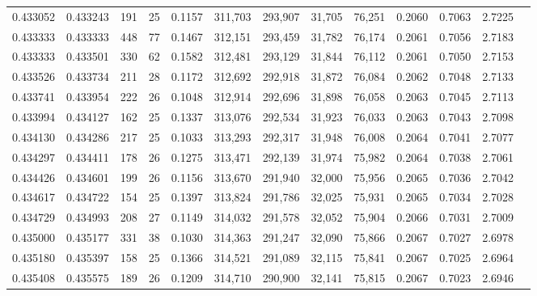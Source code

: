 \begin{tabular}{rrrrrrrrrrrrr}
0.433052 & 0.433243 &    191 &    25 &                                     0.1157 & 311,703 & 293,907 &  31,705 &  76,251 & 0.2060 & 0.7063 & 2.7225 \\
0.433333 & 0.433333 &    448 &    77 &                                     0.1467 & 312,151 & 293,459 &  31,782 &  76,174 & 0.2061 & 0.7056 & 2.7183 \\
0.433333 & 0.433501 &    330 &    62 &                                     0.1582 & 312,481 & 293,129 &  31,844 &  76,112 & 0.2061 & 0.7050 & 2.7153 \\
0.433526 & 0.433734 &    211 &    28 &                                     0.1172 & 312,692 & 292,918 &  31,872 &  76,084 & 0.2062 & 0.7048 & 2.7133 \\
0.433741 & 0.433954 &    222 &    26 &                                     0.1048 & 312,914 & 292,696 &  31,898 &  76,058 & 0.2063 & 0.7045 & 2.7113 \\
0.433994 & 0.434127 &    162 &    25 &                                     0.1337 & 313,076 & 292,534 &  31,923 &  76,033 & 0.2063 & 0.7043 & 2.7098 \\
0.434130 & 0.434286 &    217 &    25 &                                     0.1033 & 313,293 & 292,317 &  31,948 &  76,008 & 0.2064 & 0.7041 & 2.7077 \\
0.434297 & 0.434411 &    178 &    26 &                                     0.1275 & 313,471 & 292,139 &  31,974 &  75,982 & 0.2064 & 0.7038 & 2.7061 \\
0.434426 & 0.434601 &    199 &    26 &                                     0.1156 & 313,670 & 291,940 &  32,000 &  75,956 & 0.2065 & 0.7036 & 2.7042 \\
0.434617 & 0.434722 &    154 &    25 &                                     0.1397 & 313,824 & 291,786 &  32,025 &  75,931 & 0.2065 & 0.7034 & 2.7028 \\
0.434729 & 0.434993 &    208 &    27 &                                     0.1149 & 314,032 & 291,578 &  32,052 &  75,904 & 0.2066 & 0.7031 & 2.7009 \\
0.435000 & 0.435177 &    331 &    38 &                                     0.1030 & 314,363 & 291,247 &  32,090 &  75,866 & 0.2067 & 0.7027 & 2.6978 \\
0.435180 & 0.435397 &    158 &    25 &                                     0.1366 & 314,521 & 291,089 &  32,115 &  75,841 & 0.2067 & 0.7025 & 2.6964 \\
0.435408 & 0.435575 &    189 &    26 &                                     0.1209 & 314,710 & 290,900 &  32,141 &  75,815 & 0.2067 & 0.7023 & 2.6946 \\

\end{tabular}
